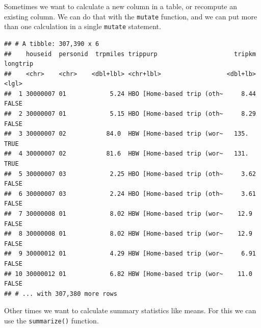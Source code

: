 \documentclass[
]{book}
\newenvironment{Shaded}{\begin{snugshade}}{\end{snugshade}}
\newcommand{\CommentTok}[1]{\textcolor[rgb]{0.56,0.35,0.01}{\textit{#1}}}
\newcommand{\DataTypeTok}[1]{\textcolor[rgb]{0.13,0.29,0.53}{#1}}
\newcommand{\DecValTok}[1]{\textcolor[rgb]{0.00,0.00,0.81}{#1}}
\newcommand{\FloatTok}[1]{\textcolor[rgb]{0.00,0.00,0.81}{#1}}
\newcommand{\KeywordTok}[1]{\textcolor[rgb]{0.13,0.29,0.53}{\textbf{#1}}}
\newcommand{\NormalTok}[1]{#1}
\newcommand{\OperatorTok}[1]{\textcolor[rgb]{0.81,0.36,0.00}{\textbf{#1}}}
\newcommand{\OtherTok}[1]{\textcolor[rgb]{0.56,0.35,0.01}{#1}}
\newcommand{\StringTok}[1]{\textcolor[rgb]{0.31,0.60,0.02}{#1}}
\begin{document}
Sometimes we want to calculate a new column in a table, or recompute an
existing column. We can do that with the \texttt{mutate} function, and we can
put more than one calculation in a single \texttt{mutate} statement.

\begin{Shaded}
\end{Shaded}

\begin{verbatim}
## # A tibble: 307,390 x 6
##    houseid  personid  trpmiles trippurp                     tripkm longtrip
##    <chr>    <chr>    <dbl+lbl> <chr+lbl>                  <dbl+lb> <lgl>   
##  1 30000007 01            5.24 HBO [Home-based trip (oth~     8.44 FALSE   
##  2 30000007 01            5.15 HBO [Home-based trip (oth~     8.29 FALSE   
##  3 30000007 02           84.0  HBW [Home-based trip (wor~   135.   TRUE    
##  4 30000007 02           81.6  HBW [Home-based trip (wor~   131.   TRUE    
##  5 30000007 03            2.25 HBO [Home-based trip (oth~     3.62 FALSE   
##  6 30000007 03            2.24 HBO [Home-based trip (oth~     3.61 FALSE   
##  7 30000008 01            8.02 HBW [Home-based trip (wor~    12.9  FALSE   
##  8 30000008 01            8.02 HBW [Home-based trip (wor~    12.9  FALSE   
##  9 30000012 01            4.29 HBW [Home-based trip (wor~     6.91 FALSE   
## 10 30000012 01            6.82 HBW [Home-based trip (wor~    11.0  FALSE   
## # ... with 307,380 more rows
\end{verbatim}

Other times we want to calculate summary statistics like means.
For this we can use the \texttt{summarize()} function.

\begin{Shaded}
\end{Shaded}
\end{document}
